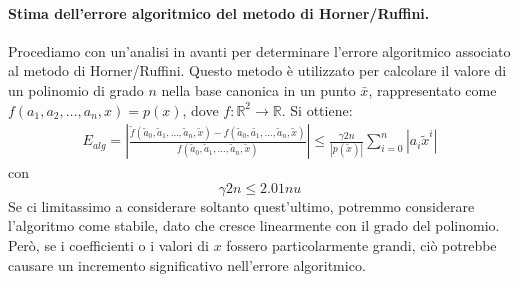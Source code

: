 \documentclass{article}
\numberwithin{equation}{section}
\begin{document}
\paragraph{Stima dell'errore algoritmico del metodo di Horner/Ruffini.}
Procediamo con un'analisi in avanti per determinare l'errore algoritmico
associato al metodo di Horner/Ruffini. Questo metodo è utilizzato per
calcolare il valore di un polinomio di grado $n$ nella base canonica 
in un punto $\bar{x}$, rappresentato come $f(a_1,a_2,\ldots,a_n,x)=p(x)$, 
dove $f:\mathbb{R}^2\rightarrow \mathbb{R}$. 
Si ottiene:
\begin{equation*}
   \begin{aligned}
       E_{alg}=\left\lvert
       \frac{\tilde{f}(\tilde{a}_0,\tilde{a}_1,\ldots,\tilde{a}_n,\tilde{x})-f(\tilde{a}_0,\tilde{a_1},\ldots,\tilde{a}_n,\tilde{x})}{f(\tilde{a}_0,\tilde{a}_1,
   \ldots,\tilde{a}_n,\tilde{x})}\right\rvert\leq \frac{\gamma2n}{\left\lvert
p(\tilde{x})\right\rvert}\displaystyle\sum_{i=0}^{n}\left\lvert a_i\tilde{x}^i\right\rvert
   \end{aligned}
\end{equation*}
con 
$$\gamma2n\leq2.01nu$$
Se ci limitassimo a considerare soltanto quest'ultimo, potremmo considerare
l'algoritmo come stabile, dato che cresce linearmente con il grado del polinomio. 
Però, se i coefficienti o i valori di $x$ fossero particolarmente grandi, ciò
potrebbe causare un incremento significativo nell'errore algoritmico.
\end{document}
